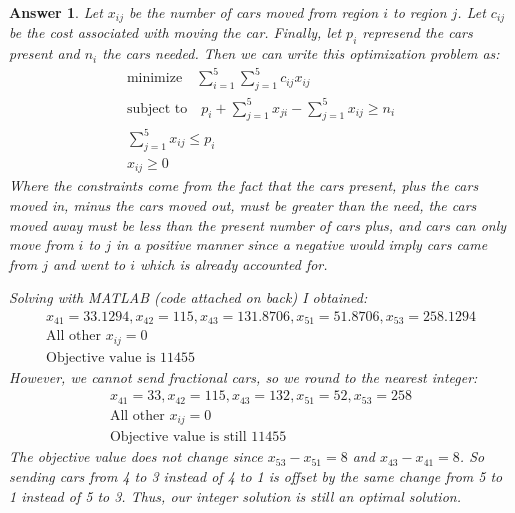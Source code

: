 \documentclass[12pt]{article}
\theoremstyle{colon}
\newtheorem*{answer}{Answer}
\begin{document}
\begin{answer}
  Let $x_{ij}$ be the number of cars moved from region $i$ to region $j$. Let $c_{ij}$ be the cost associated with moving the car. Finally, let $p_i$ represend the cars present and $n_i$ the cars needed. Then we can write this optimization problem as:
  \begin{gather*}
    \text{minimize} \quad \sum_{i = 1}^5 \sum_{j = 1}^5 c_{ij} x_{ij} \\
    \text{subject to} \quad p_i + \sum_{j = 1}^5 x_{ji} - \sum_{j = 1}^5 x_{ij} \geq n_i \\
    \sum_{j = 1}^5 x_{ij} \leq p_i \\
    x_{ij} \geq 0
  \end{gather*}
  Where the constraints come from the fact that the cars present, plus the cars moved in, minus the cars moved out, must be greater than the need, the cars moved away must be less than the present number of cars plus, and cars can only move from $i$ to $j$ in a positive manner since a negative would imply cars came from $j$ and went to $i$ which is already accounted for.

  Solving with MATLAB (code attached on back) I obtained:
  \begin{gather*}
    x_{41} = 33.1294, x_{42} = 115, x_{43} = 131.8706, x_{51} = 51.8706, x_{53} = 258.1294 \\
    \text{All other } x_{ij} = 0 \\
    \text{Objective value is } 11455
  \end{gather*}
  However, we cannot send fractional cars, so we round to the nearest integer:
  \begin{gather*}
    x_{41} = 33, x_{42} = 115, x_{43} = 132, x_{51} = 52, x_{53} = 258 \\
    \text{All other } x_{ij} = 0 \\
    \text{Objective value is still } 11455
  \end{gather*}
  The objective value does not change since $x_{53}-x_{51} = 8$ and $x_{43}-x_{41} = 8$. So sending cars from 4 to 3 instead of 4 to 1 is offset by the same change from 5 to 1 instead of 5 to 3. Thus, our integer solution is still an optimal solution.
\end{answer}
\end{document}
